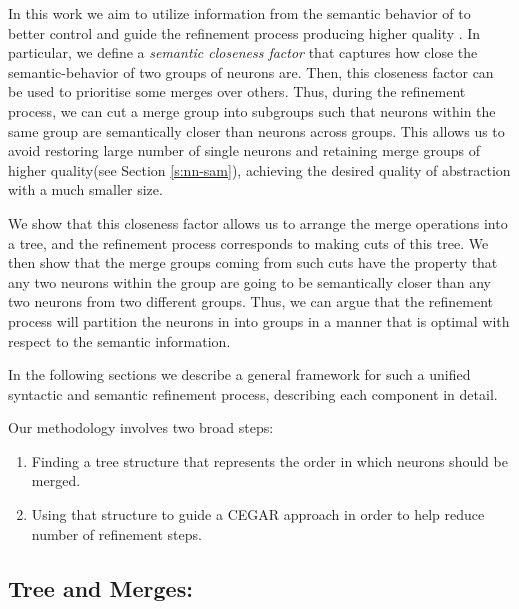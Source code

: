 In this work we aim to utilize information from the semantic behavior of \cnc to
better control and guide the refinement process producing higher quality \abs.
In particular, we define a \textit{semantic closeness factor} that captures how
close the semantic-behavior of two groups of neurons are. Then, this closeness
factor can be used to 
prioritise some merges over others. Thus, during the refinement process, we can
cut a merge group  into subgroups such that
neurons within the same group are semantically closer than neurons across
groups. This allows us to avoid restoring large number of single neurons and
retaining merge groups of higher quality(see Section \ref{s:nn-sam}), achieving
the desired quality of abstraction with a much smaller size. 

We show that this closeness factor allows us to arrange the merge operations
into a tree, and the refinement process corresponds to making cuts of this tree.
We then show that the merge groups coming from such cuts have the property that
any two neurons within the group are going to be semantically closer than any
two neurons from two different groups. Thus, we can argue that the refinement
process will partition the neurons in \cnc into groups in a manner that is
optimal with respect to the semantic information.

In the following sections we describe a general framework for such a unified
syntactic and semantic refinement process, describing each component in detail.
\linebreak

Our methodology involves two broad steps:
\begin{enumerate}
    \item Finding a tree structure that represents the order in which neurons should be merged.
    \item Using that structure to guide a CEGAR approach in order to help reduce
        number of refinement steps. 
\end{enumerate} 

\subsection{Tree and Merges:}


